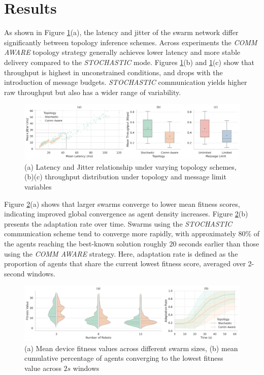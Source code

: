 \documentclass[conference]{IEEEtran}
\begin{document}
\section{Results}\label{sec:results}

As shown in Figure \ref{fig:topology}(a), the latency and jitter of the swarm network differ significantly between topology inference schemes. Across experiments the \emph{COMM AWARE} topology strategy generally achieves lower latency and more stable delivery compared to the \emph{STOCHASTIC} mode. Figures \ref{fig:topology}(b) and \ref{fig:topology}(c) show that throughput is highest in unconstrained conditions, and drops with the introduction of message budgets. \emph{STOCHASTIC} communication yields higher raw throughput but also has a wider range of variability.

\begin{figure}[h]
    \centering
    \includegraphics[width=1\textwidth]{topology_impact.pdf}
    \caption{(a) Latency and Jitter relationship under varying topology schemes, (b)(c) throughput distribution under topology and message limit variables}
    \label{fig:topology}
\end{figure}

Figure \ref{fig:performance}(a) shows that larger swarms converge to lower mean fitness scores, indicating improved global convergence as agent density increases. Figure \ref{fig:performance}(b) presents the adaptation rate over time. Swarms using the \emph{STOCHASTIC} communication scheme tend to converge more rapidly, with approximately $80\%$ of the agents reaching the best-known solution roughly 20 seconds earlier than those using the \emph{COMM AWARE} strategy. Here, adaptation rate is defined as the proportion of agents that share the current lowest fitness score, averaged over 2-second windows.

\begin{figure}[h]
    \centering
    \includegraphics[width=1\textwidth]{performance_impact.pdf}
    \caption{(a) Mean device fitness values across different swarm sizes, (b) mean cumulative percentage of agents converging to the lowest fitness value across $2s$ windows}
    \label{fig:performance}
\end{figure}
\end{document}
